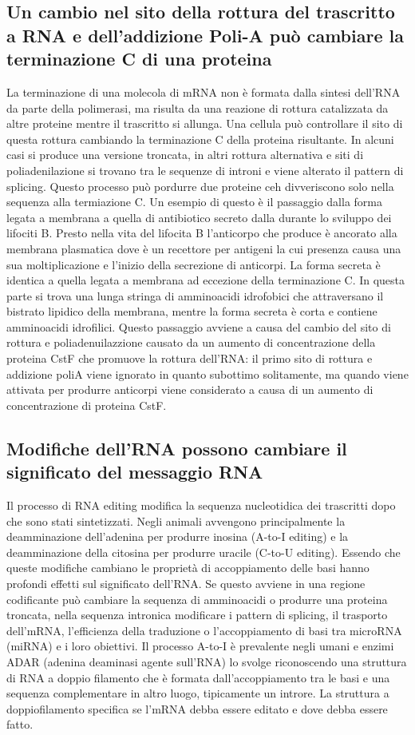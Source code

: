 \subsection{Un cambio nel sito della rottura del trascritto a RNA e dell'addizione Poli-A pu\`o cambiare la terminazione C di una proteina}
La terminazione di una molecola di mRNA non \`e formata dalla sintesi dell'RNA da parte della polimerasi, ma risulta da una reazione di rottura catalizzata da altre proteine mentre il 
trascritto si allunga. Una cellula pu\`o controllare il sito di questa rottura cambiando la terminazione C della proteina risultante. In alcuni casi si produce una versione troncata, 
in altri rottura alternativa e siti di poliadenilazione si trovano tra le sequenze di introni e viene alterato il pattern di splicing. Questo processo pu\`o pordurre due proteine ceh
divveriscono solo nella sequenza alla termiazione C. Un esempio di questo \`e il passaggio dalla forma legata a membrana a quella di antibiotico secreto dalla durante lo sviluppo dei 
lifociti B. Presto nella vita del lifocita B l'anticorpo che produce \`e ancorato alla membrana plasmatica dove \`e un recettore per antigeni la cui presenza causa una sua 
moltiplicazione e l'inizio della secrezione di anticorpi. La forma secreta \`e identica a quella legata a membrana ad eccezione della terminazione C. In questa parte si trova una
lunga stringa di amminoacidi idrofobici che attraversano il bistrato lipidico della membrana, mentre la forma secreta \`e corta e contiene amminoacidi idrofilici. Questo passaggio
avviene a causa del cambio del sito di rottura e poliadenuilazzione causato da un aumento di concentrazione della proteina CstF che promuove la rottura dell'RNA: il primo sito di 
rottura e addizione poliA viene ignorato in quanto subottimo solitamente, ma quando viene attivata per produrre anticorpi viene considerato a causa di un aumento di concentrazione di 
proteina CstF.
\subsection{Modifiche dell'RNA possono cambiare il significato del messaggio RNA}
Il processo di RNA editing modifica la sequenza nucleotidica dei trascritti dopo che sono stati sintetizzati. Negli animali avvengono principalmente la deamminazione dell'adenina per
produrre inosina (A-to-I editing) e la deamminazione della citosina per produrre uracile (C-to-U editing). Essendo che queste modifiche cambiano le propriet\`a di accoppiamento delle
basi hanno profondi effetti sul significato dell'RNA. Se questo avviene in una regione codificante pu\`o cambiare la sequenza di amminoacidi o produrre una proteina troncata, nella 
sequenza intronica modificare i pattern di splicing, il trasporto dell'mRNA, l'efficienza della traduzione o l'accoppiamento di basi tra microRNA (miRNA) e i loro obiettivi. Il processo
A-to-I \`e prevalente negli umani e enzimi ADAR (adenina deaminasi agente sull'RNA) lo svolge riconoscendo una struttura di RNA a doppio filamento che \`e formata dall'accoppiamento tra 
le basi e una sequenza complementare in altro luogo, tipicamente un introre. La struttura a doppiofilamento specifica se l'mRNA debba essere editato e dove debba essere fatto. 
